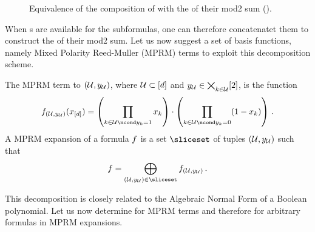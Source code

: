 \begin{figure}[t]
    \begin{center}
        
    \end{center}
    \caption{Equivalence of the composition of \computationCircuits{} with the \computationCircuit{} of their mod2 sum ().}
    \label{fig:mod2ComputationCircuit}
\end{figure}

When \computationCircuit{}s are available for the subformulas, one can therefore concatenatet them to construct the \computationCircuit{} of their mod2 sum.
Let us now suggest a set of basis functions, namely Mixed Polarity Reed-Muller (MPRM) terms to exploit this decomposition scheme.

\begin{definition}
    The MPRM term to $(\mathcal{U},y_{\mathcal{U}})$, where $\mathcal{U}\subset[d]$ and $y_{\mathcal{U}}\in\bigtimes_{k\in\mathcal{U}}[2]$, is the function
    \begin{align*}
        \formulaof{\hardparam}(\shortcatindices)
        = \left(\prod_{\catenumerator\in\hardlegset\ncond\headindexof{\catenumerator}=1} \catindexof{\catenumerator}\right)
        \cdot \left(\prod_{\catenumerator\in\hardlegset\ncond\headindexof{\catenumerator}=0} (1-\catindexof{\catenumerator})\right) \, .
    \end{align*}
    A MPRM expansion of a formula $f$ is a set $\sliceset$ of tuples $(\mathcal{U},y_{\mathcal{U}})$ such that
    \begin{align*}
        \formula = \bigoplus_{\hardparam\in\sliceset} \formulaof{\hardparam} \, .
    \end{align*}
\end{definition}

This decomposition is closely related to the Algebraic Normal Form of a Boolean polynomial.
Let us now determine \computationCircuits{} for MPRM terms and therefore for arbitrary formulas in MPRM expansions.

